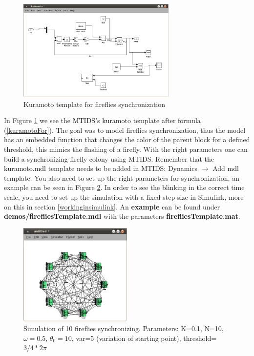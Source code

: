 \documentclass[a4paper,twoside, openright,12pt]{report}
\begin{document}
\begin{figure}[htb]
\centering
\includegraphics[width=0.7\textwidth]{pics/screenKuramoto.eps}
\caption[MTIDS Kuramoto Template]{Kuramoto template for fireflies synchronization}
\label{templateKuramotoFig}
\end{figure}
 
In Figure \ref{templateKuramotoFig} we see  the MTIDS's kuramoto template after formula (\ref{kuramotoFor}). The goal was to model fireflies synchronization, thus
the model has an embedded function that changes the color of the parent block for a defined threshold, this mimics the flashing of a firefly.
With the right parameters one can build a synchronizing firefly colony using MTIDS. Remember that the kuramoto.mdl template needs to be added in MTIDS:
Dynamics $\rightarrow$ Add mdl template. You also need to set up the right parameters for synchronization, an example can be seen in Figure \ref{syncFig}.
In order to see the blinking in the correct time scale, you need to set up the simulation with a fixed step size in Simulink, more on this in section 
\ref{workinginsimulink}. An \textbf{example} can be found under \textbf{demos/firefliesTemplate.mdl} with the parameters \textbf{firefliesTemplate.mat}.



\begin{figure}[htb]
\centering
\includegraphics[width=0.5\textwidth]{pics/screenfireflies.eps}
\caption[MTIDS fireflies synchronization]{Simulation of 10 fireflies synchronizing. Parameters: K=0.1, N=10, $\omega=0.5$, $\theta_0=10$, var=5 (variation of starting point), threshold= $3/4*2\pi$}
\label{syncFig}
\end{figure}
\end{document}
